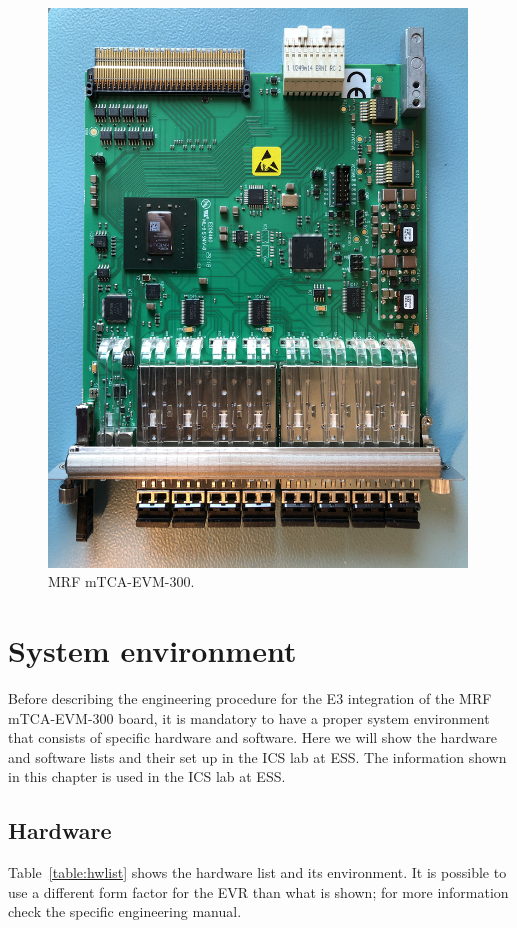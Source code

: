\documentclass[11pt
  , a4paper
  , article
  , oneside
  , showtrims
]{memoir}
\begin{document}
\begin{figure}[!htb]
  \centering
  \includegraphics[width=0.99\textwidth]{./pictures/mTCA-EVM-300.jpg}
  \caption{MRF mTCA-EVM-300.}
  \label{fig:mtcaevm300}
\end{figure}



\chapter{System environment}
Before describing the engineering procedure for the E3 integration of the MRF mTCA-EVM-300 board, it is mandatory to have a proper system environment that consists of specific hardware and software. Here we will show the hardware and software lists and their set up in the ICS lab at ESS. The information shown in this chapter is used in the ICS lab at ESS.\\


\section{Hardware}
Table~\ref{table:hwlist} shows the hardware list and its environment. It is possible to use a different form factor for the EVR than what is shown; for more information check the specific engineering manual.\\
\end{document}
